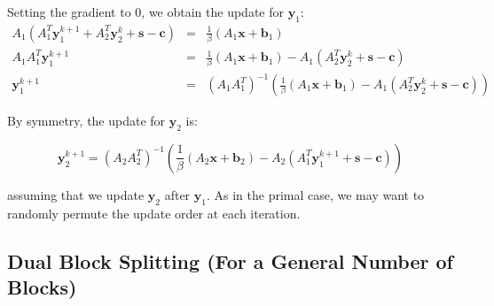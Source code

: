 \documentclass{article}
\begin{document}
Setting the gradient to 0, we obtain the update for $\mathbf{y}_{1}$:
\begin{eqnarray*}
A_{1}\left(A_{1}^{T}\mathbf{y}_{1}^{k+1}+A_{2}^{T}\mathbf{y}_{2}^{k}+\mathbf{s}-\mathbf{c}\right) & = & \frac{1}{\beta}\left(A_{1}\mathbf{x}+\mathbf{b}_{1}\right)\\
A_{1}A_{1}^{T}\mathbf{y}_{1}^{k+1} & = & \frac{1}{\beta}\left(A_{1}\mathbf{x}+\mathbf{b}_{1}\right)-A_{1}\left(A_{2}^{T}\mathbf{y}_{2}^{k}+\mathbf{s}-\mathbf{c}\right)\\
\mathbf{y}_{1}^{k+1} & = & \left(A_{1}A_{1}^{T}\right)^{-1}\left(\frac{1}{\beta}\left(A_{1}\mathbf{x}+\mathbf{b}_{1}\right)-A_{1}\left(A_{2}^{T}\mathbf{y}_{2}^{k}+\mathbf{s}-\mathbf{c}\right)\right)
\end{eqnarray*}


By symmetry, the update for $\mathbf{y}_{2}$ is:

\[
\mathbf{y}_{2}^{k+1}=\left(A_{2}A_{2}^{T}\right)^{-1}\left(\frac{1}{\beta}\left(A_{2}\mathbf{x}+\mathbf{b}_{2}\right)-A_{2}\left(A_{1}^{T}\mathbf{y}_{1}^{k+1}+\mathbf{s}-\mathbf{c}\right)\right)
\]


assuming that we update $\mathbf{y}_{2}$ after $\mathbf{y}_{1}$. As in the primal case, we may want to randomly permute the update order at each iteration.
\vspace{0.1in}
\subsection*{Dual Block Splitting (For a General Number of Blocks)}
\end{document}
